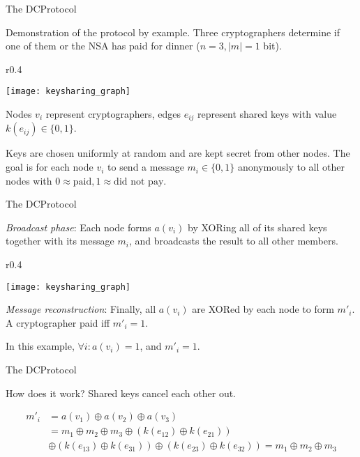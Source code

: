 \documentclass[]{beamer} %
\begin{document}
\begin{frame}{The \acl{DCProtocol}}

Demonstration of the protocol by example. Three cryptographers determine
if one of them or the NSA has paid for dinner ($n = 3, |m| = 1$ bit).

\begin{wrapfigure}{r}{0.4\textwidth}
\begin{center}
\texttt{[image: keysharing\_graph]}
\end{center}
\end{wrapfigure}

Nodes $v_i$ represent cryptographers, edges $e_{ij}$ represent shared keys
with value $k(e_{ij}) \in \{0, 1\}$.

Keys are chosen uniformly at random and are kept secret from other nodes.
The goal is for each node $v_i$ to send a message $m_i \in \{0, 1\}$
anonymously to all other nodes with $0 \approx \text{paid}, 1 \approx \text{did not pay}$.

\end{frame}

\begin{frame}{The \acl{DCProtocol}}

\emph{Broadcast phase}: Each node forms $a(v_i)$ by XORing all of its shared keys
together with its message $m_i$, and broadcasts the result to all other members.

\begin{wrapfigure}{r}{0.4\textwidth}
\begin{center}
\texttt{[image: keysharing\_graph]}
\end{center}
\end{wrapfigure}

\emph{Message reconstruction}: Finally, all $a(v_i)$ are XORed by each node to form $m'_i$.
A cryptographer paid iff $m'_i = 1$.

In this example, $\forall i: a(v_i) = 1$, and $m'_i = 1$.

\end{frame}

\begin{frame}{The \acl{DCProtocol}}

How does it work? Shared keys cancel each other out. 

\begin{align*}
m'_i &= a(v_1) \oplus a(v_2) \oplus a(v_3) \\
     &= m_1 \oplus m_2 \oplus m_3
     \oplus (k(e_{12}) \oplus k(e_{21})) \\
     & \oplus (k(e_{13}) \oplus k(e_{31})) 
     \oplus (k(e_{23}) \oplus k(e_{32})) = m_1 \oplus m_2 \oplus m_3
\end{align*}

\end{frame}
\end{document}
